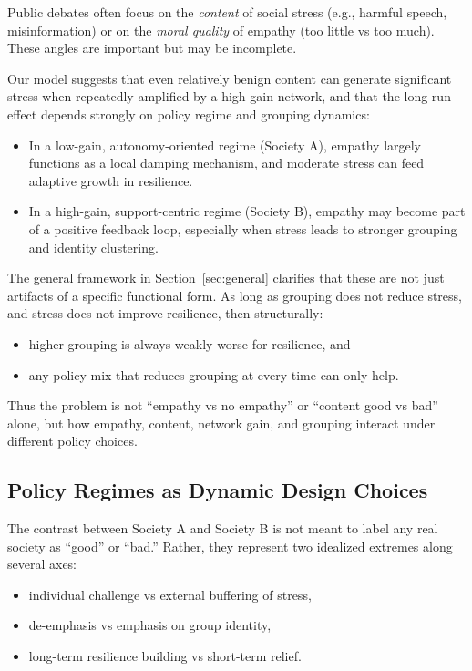 \documentclass[11pt]{article}
\theoremstyle{plain}
\begin{document}
Public debates often focus on the \emph{content} of social stress (e.g., harmful speech, misinformation) or on the \emph{moral quality} of empathy (too little vs too much).
These angles are important but may be incomplete.

Our model suggests that even relatively benign content can generate significant stress when repeatedly amplified by a high-gain network, and that the long-run effect depends strongly on policy regime and grouping dynamics:
\begin{itemize}
  \item In a low-gain, autonomy-oriented regime (Society A), empathy largely functions as a local damping mechanism, and moderate stress can feed adaptive growth in resilience.
  \item In a high-gain, support-centric regime (Society B), empathy may become part of a positive feedback loop, especially when stress leads to stronger grouping and identity clustering.
\end{itemize}

The general framework in Section~\ref{sec:general} clarifies that these are not just artifacts of a specific functional form.
As long as grouping does not reduce stress, and stress does not improve resilience, then structurally:
\begin{itemize}
  \item higher grouping is always weakly worse for resilience, and
  \item any policy mix that reduces grouping at every time can only help.
\end{itemize}

Thus the problem is not ``empathy vs no empathy'' or ``content good vs bad'' alone, but how empathy, content, network gain, and grouping interact under different policy choices.

\subsection{Policy Regimes as Dynamic Design Choices}

The contrast between Society A and Society B is not meant to label any real society as ``good'' or ``bad.''
Rather, they represent two idealized extremes along several axes:
\begin{itemize}
  \item individual challenge vs external buffering of stress,
  \item de-emphasis vs emphasis on group identity,
  \item long-term resilience building vs short-term relief.
\end{itemize}
\end{document}

